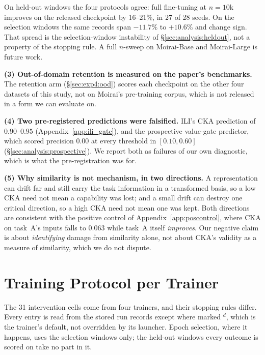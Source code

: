 \noindent On held-out windows the four protocols agree: full fine-tuning at
$n{=}10$k improves on the released checkpoint by 16--21\%, in 27 of 28 seeds.  On
the selection windows the same records span $-11.7\%$ to $+10.6\%$ and change
sign.  That spread is the selection-window instability of
\S\ref{sec:analysis:heldout}, not a property of the stopping rule.
A full $n$-sweep on Moirai-Base and Moirai-Large is future work.

\textbf{(3) Out-of-domain retention is measured on the paper's benchmarks.}
The retention arm (\S\ref{sec:exp4:ood}) scores each checkpoint on the other
four datasets of this study, not on Moirai's pre-training corpus, which is not
released in a form we can evaluate on.

\textbf{(4) Two pre-registered predictions were falsified.}  ILI's CKA prediction
of $0.90$--$0.95$ (Appendix~\ref{app:ili_gate}), and the prospective value-gate
predictor, which scored precision $0.00$ at every threshold in $[0.10, 0.60]$
(\S\ref{sec:analysis:prospective}).  We report both as failures of our own
diagnostic, which is what the pre-registration was for.

\textbf{(5) Why similarity is not mechanism, in two directions.}  A representation
can drift far and still carry the task information in a transformed basis, so a
low CKA need not mean a capability was lost; and a small drift can destroy one
critical direction, so a high CKA need not mean one was kept.  Both directions are
consistent with the positive control of Appendix~\ref{app:poscontrol}, where CKA
on task~A's inputs falls to $0.063$ while task~A itself \emph{improves}.  Our
negative claim is about \emph{identifying} damage from similarity alone, not about
CKA's validity as a measure of similarity, which we do not dispute.

\section{Training Protocol per Trainer}
\label{app:trainers}
The 31 intervention cells come from four trainers, and their stopping rules
differ.  Every entry is read from the stored run records except where marked
$^{d}$, which is the trainer's default, not overridden by its launcher.  Epoch
selection, where it happens, uses the selection windows only; the held-out
windows every outcome is scored on take no part in it.

